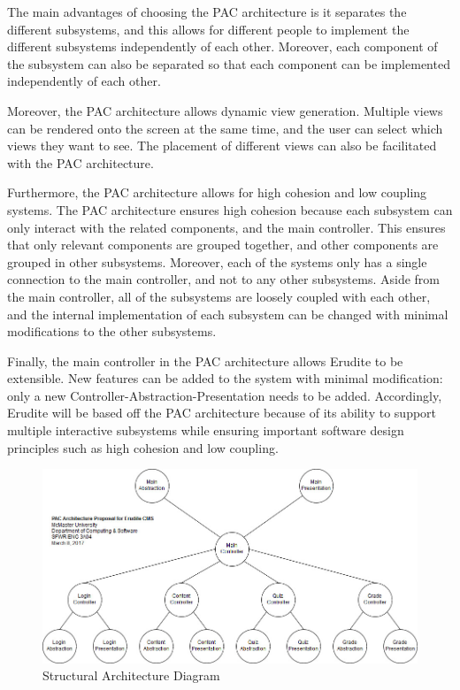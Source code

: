 \documentclass[]{article}
\begin{document}
The main advantages of choosing the PAC architecture is it separates the 
different subsystems, and this allows for different people to implement the 
different subsystems independently of each other. Moreover, each component of 
the subsystem can also be separated so that each component can be implemented 
independently of each other.

Moreover, the PAC architecture allows dynamic view generation. Multiple views 
can be rendered onto the screen at the same time, and the user can select which 
views they want to see. The placement of different views can also be facilitated 
with the PAC architecture.

Furthermore, the PAC architecture allows for high cohesion and low coupling 
systems. The PAC architecture ensures high cohesion because each subsystem can 
only interact with the related components, and the main controller. This ensures 
that only relevant components are grouped together, and other components are 
grouped in other subsystems. Moreover, each of the systems only has a single 
connection to the main controller, and not to any other subsystems. Aside from 
the main controller, all of the subsystems are loosely coupled with each other, 
and the internal implementation of each subsystem can be changed with minimal 
modifications to the other subsystems.

Finally, the main controller in the PAC architecture allows Erudite to be 
extensible. New features can be added to the system with minimal modification: 
only a new Controller-Abstraction-Presentation needs to be added. Accordingly, 
Erudite will be based off the PAC architecture because of its ability to support 
multiple interactive subsystems while ensuring important software design 
principles such as high cohesion and low coupling.

{
  \begin{figure}[h]
  \centering
    \includegraphics[scale=0.5]{A2_Assets/Structural_Class_Diagram_v3.jpg}
  \caption{Structural Architecture Diagram}
  \end{figure}
}
\end{document}
